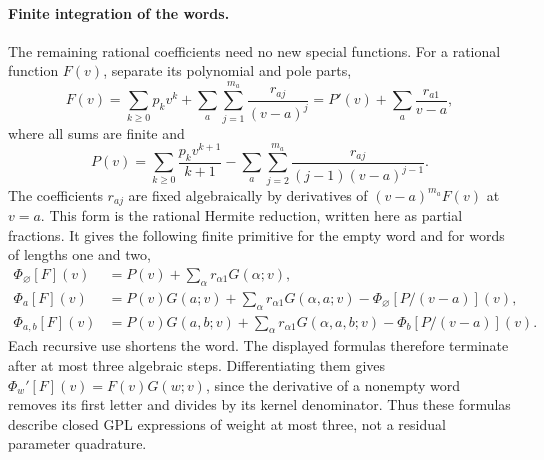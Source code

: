 \paragraph{Finite integration of the words.}
The remaining rational coefficients need no new special functions.
For a rational function $F(v)$, separate its polynomial and pole
parts,
\begin{equation}
 F(v)=\sum_{k\geq0}p_kv^k
       +\sum_a\sum_{j=1}^{m_a}\frac{r_{aj}}{(v-a)^j}
       =P'(v)+\sum_a\frac{r_{a1}}{v-a},
\end{equation}
where all sums are finite and
\begin{equation}
 P(v)=\sum_{k\geq0}\frac{p_kv^{k+1}}{k+1}
       -\sum_a\sum_{j=2}^{m_a}
                    \frac{r_{aj}}{(j-1)(v-a)^{j-1}}.
\end{equation}
The coefficients $r_{aj}$ are fixed algebraically by derivatives
of $(v-a)^{m_a}F(v)$ at $v=a$. This form is the rational
Hermite reduction, written here as partial fractions.
It gives the following finite primitive for the empty word and
for words of lengths one and two,
\begin{align}
 \Phi_{\varnothing}[F](v)
   &=P(v)+\sum_\alpha r_{\alpha1}G(\alpha;v),\\
 \Phi_a[F](v)
   &=P(v)G(a;v)+\sum_\alpha r_{\alpha1}G(\alpha,a;v)
                            -\Phi_{\varnothing}[P/(v-a)](v),\\
 \Phi_{a,b}[F](v)
   &=P(v)G(a,b;v)+\sum_\alpha r_{\alpha1}G(\alpha,a,b;v)
                            -\Phi_b[P/(v-a)](v).
 \label{eq:comp-supp-box-gpl-primitive}
\end{align}
Each recursive use shortens the word. The displayed formulas
therefore terminate after at most three algebraic steps.
Differentiating them gives
$\Phi_w'[F](v)=F(v)G(w;v)$, since the derivative of a nonempty
word removes its first letter and divides by its kernel denominator.
Thus these formulas describe closed GPL expressions of weight
at most three, not a residual parameter quadrature.

